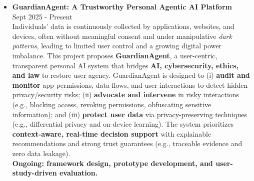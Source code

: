\documentclass[10pt,article]{article}
\begin{document}
\begin{itemize}
    \item \textbf{GuardianAgent: A Trustworthy Personal Agentic AI Platform} \\ \hfill Sept 2025 - Present \\
   Individuals' data is continuously collected by applications, websites, and devices, often without meaningful consent and under manipulative \textit{dark patterns}, leading to limited user control and a growing digital power imbalance. This project proposes \textbf{GuardianAgent}, a user-centric, transparent personal AI system that bridges \textbf{AI, cybersecurity, ethics, and law} to restore user agency. GuardianAgent is designed to (i) \textbf{audit and monitor} app permissions, data flows, and user interactions to detect hidden privacy/security risks; (ii) \textbf{advocate and intervene} in risky interactions (e.g., blocking access, revoking permissions, obfuscating sensitive information); and (iii) \textbf{protect user data} via privacy-preserving techniques (e.g., differential privacy and on-device learning). The system prioritizes \textbf{context-aware, real-time decision support} with explainable recommendations and strong trust guarantees (e.g., traceable evidence and zero data leakage). \\
    \textbf{Ongoing: framework design, prototype development, and user-study-driven evaluation.}
    
\end{itemize}
\end{document}

